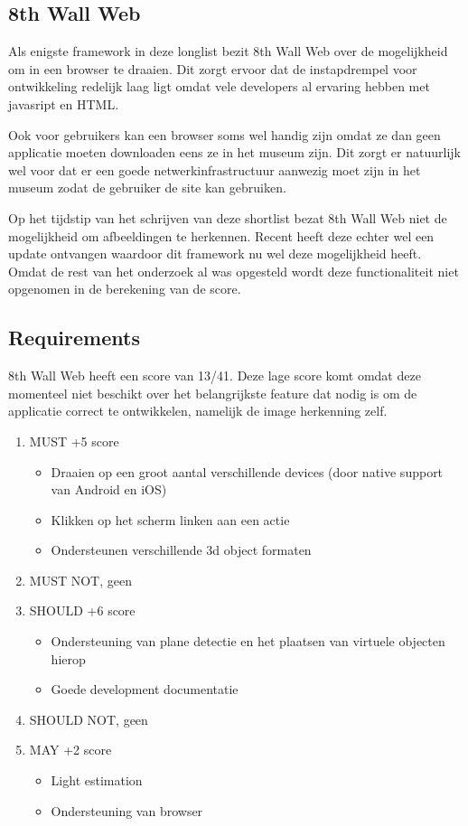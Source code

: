 \subsection{8th Wall Web}
Als enigste framework in deze longlist bezit 8th Wall Web over de mogelijkheid om in een browser te draaien. Dit zorgt ervoor dat de instapdrempel voor ontwikkeling redelijk laag ligt omdat vele developers al ervaring hebben met javasript en HTML.

Ook voor gebruikers kan een browser soms wel handig zijn omdat ze dan geen applicatie moeten downloaden eens ze in het museum zijn. Dit zorgt er natuurlijk wel voor dat er een goede netwerkinfrastructuur aanwezig moet zijn in het museum zodat de gebruiker de site kan gebruiken.

Op het tijdstip van het schrijven van deze shortlist bezat 8th Wall Web niet de mogelijkheid om afbeeldingen te herkennen. Recent heeft deze echter wel een update ontvangen waardoor dit framework nu wel deze mogelijkheid heeft. Omdat de rest van het onderzoek al was opgesteld wordt deze functionaliteit niet opgenomen in de berekening van de score.

\subsection{Requirements}
8th Wall Web heeft een score van 13/41. Deze lage score komt omdat deze momenteel niet beschikt over het belangrijkste feature dat nodig is om de applicatie correct te ontwikkelen, namelijk de image herkenning zelf. 
\begin{enumerate}
    \item MUST +5 score
    \begin{itemize}
        \item Draaien op een groot aantal verschillende devices (door native support van Android en iOS)
        \item Klikken op het scherm linken aan een actie 
        \item Ondersteunen verschillende 3d object formaten
    \end{itemize}
    \item MUST NOT, geen
    \item SHOULD +6 score
    \begin{itemize}
        \item Ondersteuning van plane detectie en het plaatsen van virtuele objecten hierop
        \item Goede development documentatie
    \end{itemize}
    \item SHOULD NOT, geen
    \item MAY +2 score
    \begin{itemize}
        \item Light estimation
        \item Ondersteuning van browser
    \end{itemize}
\end{enumerate}

